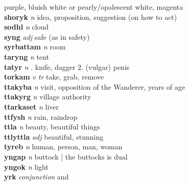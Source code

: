 purple, bluish white or pearly/opalescent white, magenta \\\textbf{shoryk}   \emph{n} \textperiodcentered idea, proposition, suggestion (on how to act)\\\textbf{sodhl}   \emph{n} \textperiodcentered cloud\\\textbf{syng}   \emph{adj} \textperiodcentered safe (as in safety)\\\textbf{syrbattam}   \emph{n} \textperiodcentered room\\\textbf{taryng}   \emph{n} \textperiodcentered tent\\\textbf{tatyr}   \emph{n} . knife, dagger 2. (vulgar) penis \\\textbf{torkam}   \emph{v tr} \textperiodcentered take, grab, remove\\\textbf{ttakyba}   \emph{n} \textperiodcentered visit, opposition of the Wanderer, years of age\\\textbf{ttakyrg}   \emph{n} \textperiodcentered village authority\\\textbf{ttarkaset}   \emph{n} \textperiodcentered liver\\\textbf{ttfysh}   \emph{n} \textperiodcentered rain, raindrop\\\textbf{ttla}   \emph{n} \textperiodcentered beauty, beautiful things\\\textbf{ttlyttla}   \emph{adj} \textperiodcentered beautiful, stunning\\\textbf{tyreb}   \emph{n} \textperiodcentered human, person, man, woman\\\textbf{yngap}   \emph{n} \textperiodcentered buttock | the buttocks is dual\\\textbf{yngok}   \emph{n} \textperiodcentered light\\\textbf{yrk}   \emph{conjunction} \textperiodcentered and\\